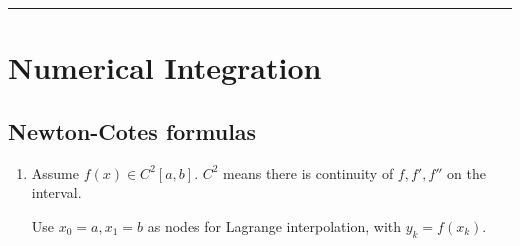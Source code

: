 \documentclass[12pt,letterpaper,noanswers]{exam}
\begin{document}
\vspace{0.2cm}
\hrule
\vspace{0.2cm}


\section*{Numerical Integration}


\subsection*{Newton-Cotes formulas}

\begin{enumerate}[resume=classQ]
\item Assume $f(x) \in C^2[a,b]$.  $C^2$ means there is continuity of $f, f', f''$ on the interval.  

Use $x_0 = a, x_1 = b$ as nodes for Lagrange interpolation, with $y_k = f(x_k)$.
\end{enumerate}




\end{document}
